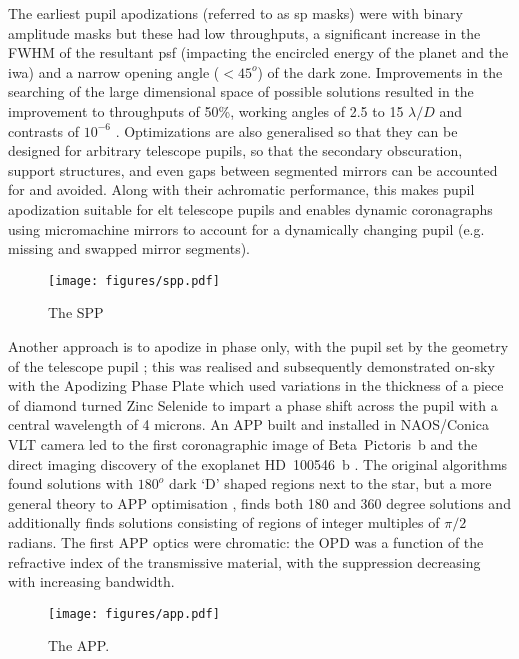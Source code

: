 \documentclass[letterpaper]{ar-1col}
\newcommand{\ld}{$\lambda/D$}
\begin{document}
The earliest pupil apodizations (referred to as \ac{sp} masks) were with binary amplitude masks \citep{Jacquinot64,Kasdin05} but these had low throughputs, a significant increase in the FWHM of the resultant \ac{psf} (impacting the encircled energy of the planet and the \ac{iwa}) and a narrow opening angle ($<45^o$) of the dark zone.
% 
Improvements in the searching of the large dimensional space of possible solutions resulted in the improvement to throughputs of 50\%, working angles of 2.5 to 15 \ld{} and contrasts of $10^{-6}$ \citep{Carlotti11}.
%
Optimizations are also generalised so that they can be designed for arbitrary telescope pupils, so that the secondary obscuration, support structures, and even gaps between segmented mirrors can be accounted for and avoided.
%
Along with their achromatic performance, this makes pupil apodization  suitable for \ac{elt} telescope pupils and enables dynamic coronagraphs using micromachine mirrors \citep{Leboulleux22b,Carlotti23} to account for a dynamically changing pupil (e.g. missing and swapped mirror segments).


\begin{figure}[ht]
  \centering
  \texttt{[image: figures/spp.pdf]}
  \caption{The SPP}
  \label{fig:coro_spp}
\end{figure}




Another approach is to apodize in phase only, with the pupil set by the geometry of the telescope pupil \citep{Codona04}; this was realised and subsequently demonstrated on-sky with the Apodizing Phase Plate \citep[APP; ][]{Kenworthy07} which used variations in the thickness of a piece of diamond turned Zinc Selenide to impart a phase shift across the pupil with a central wavelength of 4 microns.
%
An APP built and installed in NAOS/Conica VLT camera \citep{Kenworthy10} led to the first coronagraphic image of Beta~Pictoris~b \citep{Quanz10} and the direct imaging discovery of the exoplanet HD~100546~b \citep{Quanz13}.
%
The original algorithms found solutions with $180^o$ dark `D' shaped regions next to the star, but a more general theory to APP optimisation \citep{Por17}, finds both 180 and 360 degree solutions and additionally finds solutions consisting of regions of integer multiples of $\pi/2$ radians.
%
The first APP optics were chromatic: the OPD was a function of the refractive index of the transmissive material, with the suppression decreasing with increasing bandwidth.


\begin{figure}[ht]
  \centering
  \texttt{[image: figures/app.pdf]}
  \caption{The APP.}
  \label{fig:coro_app}
\end{figure}
\end{document}
